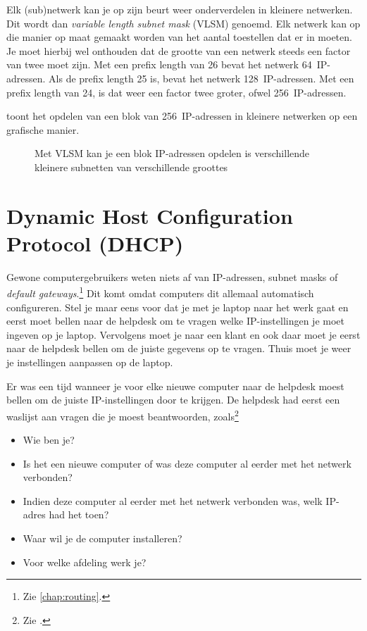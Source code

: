 Elk (sub)netwerk kan je op zijn beurt weer onderverdelen in kleinere netwerken.
Dit wordt dan \emph{variable length subnet mask} (VLSM) genoemd.
Elk netwerk kan op die manier op maat gemaakt worden van het aantal toestellen dat er in moeten.
Je moet hierbij wel onthouden dat de grootte van een netwerk steeds een factor van twee moet zijn.
Met een prefix length van 26 bevat het netwerk 64~IP-adressen.
Als de prefix length 25 is, bevat het netwerk 128~IP-adressen.
Met een prefix length van 24, is dat weer een factor twee groter, ofwel 256~IP-adressen.

 toont het opdelen van een blok van 256~IP-adressen in kleinere netwerken op een grafische manier.


\begin{figure}[hbp]
   \centering
   \caption{Met VLSM kan je een blok IP-adressen opdelen is verschillende kleinere subnetten van verschillende groottes}
   \label{fig:vlsm}
\end{figure}



\section{Dynamic Host Configuration Protocol (DHCP)}
\label{sec:dhcp}

Gewone computergebruikers weten niets af van IP-adressen, subnet masks of \emph{default gateways}.\footnote{Zie \vref{chap:routing}.}
Dit komt omdat computers dit allemaal automatisch configureren.
Stel je maar eens voor dat je met je laptop naar het werk gaat en eerst moet bellen naar de helpdesk om te vragen welke IP-instellingen je moet ingeven op je laptop.
Vervolgens moet je naar een klant en ook daar moet je eerst naar de helpdesk bellen om de juiste gegevens op te vragen.
Thuis moet je weer je instellingen aanpassen op de laptop.

Er was een tijd wanneer je voor elke nieuwe computer naar de helpdesk moest bellen om de juiste IP-instellingen door te krijgen.
De helpdesk had eerst een waslijst aan vragen die je moest beantwoorden, zoals\footnote{Zie \cite[4]{droms02}.}
\begin{itemize}
\item Wie ben je?
\item Is het een nieuwe computer of was deze computer al eerder met het netwerk verbonden?
\item Indien deze computer al eerder met het netwerk verbonden was, welk IP-adres had het toen?
\item Waar wil je de computer installeren?
\item Voor welke afdeling werk je?
\end{itemize}

